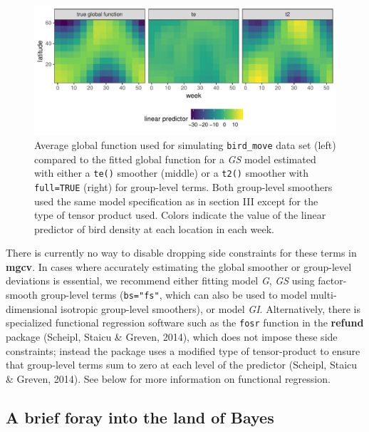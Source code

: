 \documentclass[12pt]{article}
\begin{document}
\begin{figure}
\centering
\includegraphics{../figures/global_bias_plot-1.pdf}
\caption{\label{fig:global_bias}Average global function used for
simulating \texttt{bird\_move} data set (left) compared to the fitted
global function for a \emph{GS} model estimated with either a
\texttt{te()} smoother (middle) or a \texttt{t2()} smoother with
\texttt{full=TRUE} (right) for group-level terms. Both group-level
smoothers used the same model specification as in section III except for
the type of tensor product used. Colors indicate the value of the linear
predictor of bird density at each location in each week.}
\end{figure}

There is currently no way to disable dropping side constraints for these
terms in \textbf{mgcv}. In cases where accurately estimating the global
smoother or group-level deviations is essential, we recommend either
fitting model \emph{G}, \emph{GS} using factor-smooth group-level terms
(\texttt{bs="fs"}, which can also be used to model multi-dimensional
isotropic group-level smoothers), or model \emph{GI}. Alternatively,
there is specialized functional regression software such as the
\texttt{fosr} function in the \textbf{refund} package (Scheipl, Staicu
\& Greven, 2014), which does not impose these side constraints; instead
the package uses a modified type of tensor-product to ensure that
group-level terms sum to zero at each level of the predictor (Scheipl,
Staicu \& Greven, 2014). See below for more information on functional
regression.

\subsection{A brief foray into the land of
Bayes}\label{a-brief-foray-into-the-land-of-bayes}
\end{document}
